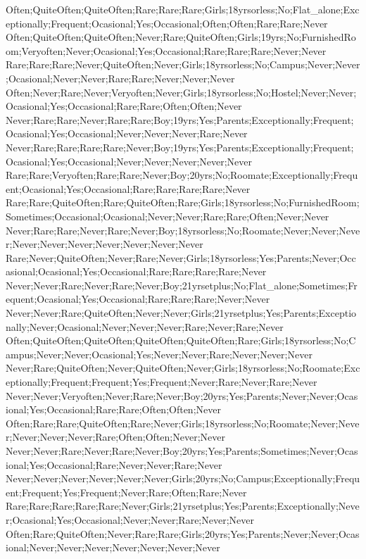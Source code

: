 Often;QuiteOften;QuiteOften;Rare;Rare;Rare;Girls;18yrsorless;No;Flat_alone;Exceptionally;Frequent;Ocasional;Yes;Occasional;Often;Often;Rare;Rare;Never
Often;QuiteOften;QuiteOften;Never;Rare;QuiteOften;Girls;19yrs;No;FurnishedRoom;Veryoften;Never;Ocasional;Yes;Occasional;Rare;Rare;Rare;Never;Never
Rare;Rare;Rare;Never;QuiteOften;Never;Girls;18yrsorless;No;Campus;Never;Never;Ocasional;Never;Never;Rare;Rare;Never;Never;Never
Often;Never;Rare;Never;Veryoften;Never;Girls;18yrsorless;No;Hostel;Never;Never;Ocasional;Yes;Occasional;Rare;Rare;Often;Often;Never
Never;Rare;Rare;Never;Rare;Rare;Boy;19yrs;Yes;Parents;Exceptionally;Frequent;Ocasional;Yes;Occasional;Never;Never;Never;Rare;Never
Never;Rare;Rare;Rare;Rare;Never;Boy;19yrs;Yes;Parents;Exceptionally;Frequent;Ocasional;Yes;Occasional;Never;Never;Never;Never;Never
Rare;Rare;Veryoften;Rare;Rare;Never;Boy;20yrs;No;Roomate;Exceptionally;Frequent;Ocasional;Yes;Occasional;Rare;Rare;Rare;Rare;Never
Rare;Rare;QuiteOften;Rare;QuiteOften;Rare;Girls;18yrsorless;No;FurnishedRoom;Sometimes;Occasional;Ocasional;Never;Never;Rare;Rare;Often;Never;Never
Never;Rare;Rare;Never;Rare;Never;Boy;18yrsorless;No;Roomate;Never;Never;Never;Never;Never;Never;Never;Never;Never;Never
Rare;Never;QuiteOften;Never;Rare;Never;Girls;18yrsorless;Yes;Parents;Never;Occasional;Ocasional;Yes;Occasional;Rare;Rare;Rare;Rare;Never
Never;Never;Rare;Never;Rare;Never;Boy;21yrsetplus;No;Flat_alone;Sometimes;Frequent;Ocasional;Yes;Occasional;Rare;Rare;Rare;Never;Never
Never;Never;Rare;QuiteOften;Never;Never;Girls;21yrsetplus;Yes;Parents;Exceptionally;Never;Ocasional;Never;Never;Never;Rare;Never;Rare;Never
Often;QuiteOften;QuiteOften;QuiteOften;QuiteOften;Rare;Girls;18yrsorless;No;Campus;Never;Never;Ocasional;Yes;Never;Never;Rare;Never;Never;Never
Never;Rare;QuiteOften;Never;QuiteOften;Never;Girls;18yrsorless;No;Roomate;Exceptionally;Frequent;Frequent;Yes;Frequent;Never;Rare;Never;Rare;Never
Never;Never;Veryoften;Never;Rare;Never;Boy;20yrs;Yes;Parents;Never;Never;Ocasional;Yes;Occasional;Rare;Rare;Often;Often;Never
Often;Rare;Rare;QuiteOften;Rare;Never;Girls;18yrsorless;No;Roomate;Never;Never;Never;Never;Never;Rare;Often;Often;Never;Never
Never;Never;Rare;Never;Rare;Never;Boy;20yrs;Yes;Parents;Sometimes;Never;Ocasional;Yes;Occasional;Rare;Never;Never;Rare;Never
Never;Never;Never;Never;Never;Never;Girls;20yrs;No;Campus;Exceptionally;Frequent;Frequent;Yes;Frequent;Never;Rare;Often;Rare;Never
Rare;Rare;Rare;Rare;Rare;Never;Girls;21yrsetplus;Yes;Parents;Exceptionally;Never;Ocasional;Yes;Occasional;Never;Never;Rare;Never;Never
Often;Rare;QuiteOften;Never;Rare;Rare;Girls;20yrs;Yes;Parents;Never;Never;Ocasional;Never;Never;Never;Never;Never;Never;Never
